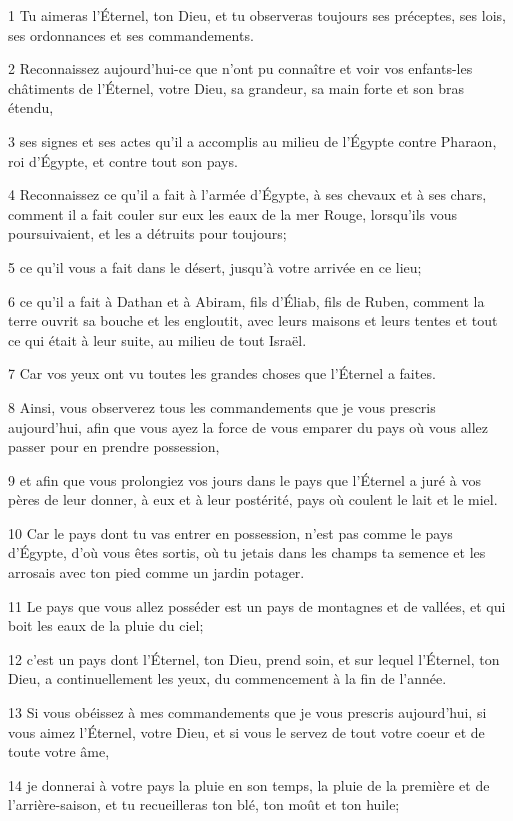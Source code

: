 \par 1 Tu aimeras l'Éternel, ton Dieu, et tu observeras toujours ses préceptes, ses lois, ses ordonnances et ses commandements.
\par 2 Reconnaissez aujourd'hui-ce que n'ont pu connaître et voir vos enfants-les châtiments de l'Éternel, votre Dieu, sa grandeur, sa main forte et son bras étendu,
\par 3 ses signes et ses actes qu'il a accomplis au milieu de l'Égypte contre Pharaon, roi d'Égypte, et contre tout son pays.
\par 4 Reconnaissez ce qu'il a fait à l'armée d'Égypte, à ses chevaux et à ses chars, comment il a fait couler sur eux les eaux de la mer Rouge, lorsqu'ils vous poursuivaient, et les a détruits pour toujours;
\par 5 ce qu'il vous a fait dans le désert, jusqu'à votre arrivée en ce lieu;
\par 6 ce qu'il a fait à Dathan et à Abiram, fils d'Éliab, fils de Ruben, comment la terre ouvrit sa bouche et les engloutit, avec leurs maisons et leurs tentes et tout ce qui était à leur suite, au milieu de tout Israël.
\par 7 Car vos yeux ont vu toutes les grandes choses que l'Éternel a faites.
\par 8 Ainsi, vous observerez tous les commandements que je vous prescris aujourd'hui, afin que vous ayez la force de vous emparer du pays où vous allez passer pour en prendre possession,
\par 9 et afin que vous prolongiez vos jours dans le pays que l'Éternel a juré à vos pères de leur donner, à eux et à leur postérité, pays où coulent le lait et le miel.
\par 10 Car le pays dont tu vas entrer en possession, n'est pas comme le pays d'Égypte, d'où vous êtes sortis, où tu jetais dans les champs ta semence et les arrosais avec ton pied comme un jardin potager.
\par 11 Le pays que vous allez posséder est un pays de montagnes et de vallées, et qui boit les eaux de la pluie du ciel;
\par 12 c'est un pays dont l'Éternel, ton Dieu, prend soin, et sur lequel l'Éternel, ton Dieu, a continuellement les yeux, du commencement à la fin de l'année.
\par 13 Si vous obéissez à mes commandements que je vous prescris aujourd'hui, si vous aimez l'Éternel, votre Dieu, et si vous le servez de tout votre coeur et de toute votre âme,
\par 14 je donnerai à votre pays la pluie en son temps, la pluie de la première et de l'arrière-saison, et tu recueilleras ton blé, ton moût et ton huile;
